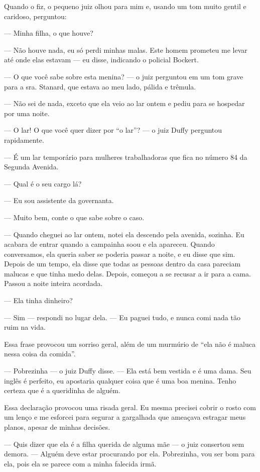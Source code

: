 Quando o fiz, o pequeno juiz olhou para mim e, usando um tom muito
gentil e caridoso, perguntou:

--- Minha filha, o que houve?

--- Não houve nada, eu só perdi minhas malas. Este homem prometeu me
levar até onde elas estavam --- eu disse, indicando o policial Bockert.

--- O que você sabe sobre esta menina? --- o juiz perguntou em um tom
grave para a sra. Stanard, que estava ao meu lado, pálida e trêmula.

--- Não sei de nada, exceto que ela veio ao lar ontem e pediu para se
hospedar por uma noite.

--- O lar! O que você quer dizer por ``o lar''? --- o juiz Duffy
perguntou rapidamente.

--- É um lar temporário para mulheres trabalhadoras que fica no número
84 da Segunda Avenida.

--- Qual é o seu cargo lá?

--- Eu sou assistente da governanta.

--- Muito bem, conte o que sabe sobre o caso.

--- Quando cheguei ao lar ontem, notei ela descendo pela avenida,
sozinha. Eu acabara de entrar quando a campainha soou e ela apareceu.
Quando conversamos, ela queria saber se poderia passar a noite, e eu
disse que sim. Depois de um tempo, ela disse que todas as pessoas dentro
da casa pareciam malucas e que tinha medo delas. Depois, começou a se
recusar a ir para a cama. Passou a noite inteira acordada.

--- Ela tinha dinheiro?

--- Sim --- respondi no lugar dela. --- Eu paguei tudo, e nunca comi
nada tão ruim na vida.

Essa frase provocou um sorriso geral, além de um murmúrio de ``ela não é
maluca nessa coisa da comida''.

--- Pobrezinha --- o juiz Duffy disse. --- Ela está bem vestida e é uma
dama. Seu inglês é perfeito, eu apostaria qualquer coisa que é uma boa
menina. Tenho certeza que é a queridinha de alguém.

Essa declaração provocou uma risada geral. Eu mesma precisei cobrir o
rosto com um lenço e me esforcei para segurar a gargalhada que ameaçava
estragar meus planos, apesar de minhas decisões.

--- Quis dizer que ela é a filha querida de alguma mãe --- o juiz
consertou sem demora. --- Alguém deve estar procurando por ela.
Pobrezinha, vou ser bom para ela, pois ela se parece com a minha
falecida irmã.

